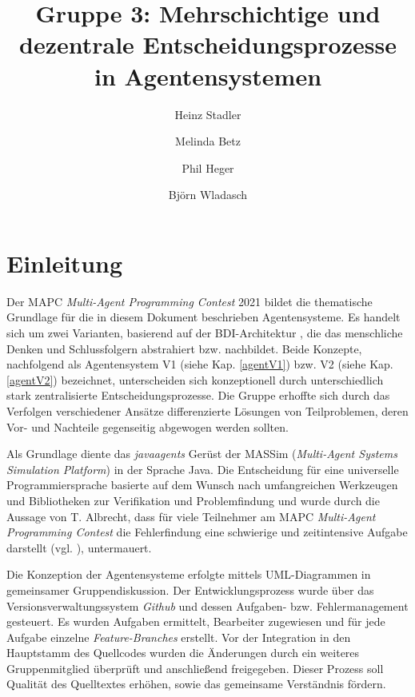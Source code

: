 \documentclass[runningheads]{llncs}
\begin{document}
	\title{Gruppe 3: Mehrschichtige und dezentrale Entscheidungsprozesse in Agentensystemen}
	\author{Heinz Stadler\and
		Melinda Betz\and
		Phil Heger\and
		Björn Wladasch}
	\maketitle              %
	\section{Einleitung}
	Der MAPC \textit{Multi-Agent Programming Contest} 2021 \cite{MAPC2021} bildet die thematische Grundlage für die in diesem Dokument beschrieben Agentensysteme. Es handelt sich um zwei Varianten, basierend auf der BDI-Architektur \cite{Bratman1987}, die das menschliche Denken und Schlussfolgern abstrahiert bzw. nachbildet. Beide Konzepte, nachfolgend als Agentensystem V1 (siehe Kap. \ref{agentV1}) bzw. V2 (siehe Kap. \ref{agentV2}) bezeichnet, unterscheiden sich konzeptionell durch unterschiedlich stark zentralisierte Entscheidungsprozesse.
	Die Gruppe erhoffte sich durch das Verfolgen verschiedener Ansätze differenzierte Lösungen von Teilproblemen, deren Vor- und Nachteile gegenseitig abgewogen werden sollten.
	
	
	Als Grundlage diente das \textit{javaagents} Gerüst der MASSim (\textit{Multi-Agent Systems Simulation Platform}) \cite{EISMASSim} in der Sprache Java. Die Entscheidung für eine universelle Programmiersprache basierte auf dem Wunsch nach umfangreichen Werkzeugen und Bibliotheken zur Verifikation und Problemfindung und wurde durch die Aussage von T. Albrecht, dass für viele Teilnehmer am MAPC \textit{Multi-Agent Programming Contest} die Fehlerfindung eine schwierige und zeitintensive Aufgabe darstellt (vgl. \cite[S. 17]{Ahlbrecht2021}), untermauert.
	
	Die Konzeption der Agentensysteme erfolgte mittels UML-Diagrammen in gemeinsamer Gruppendiskussion.
	Der Entwicklungsprozess wurde über das Versionsverwaltungssystem \textit{Github} und dessen Aufgaben- bzw. Fehlermanagement gesteuert. Es wurden Aufgaben ermittelt, Bearbeiter zugewiesen und für jede Aufgabe einzelne \textit{Feature-Branches} erstellt. Vor der Integration in den Hauptstamm des Quellcodes wurden die Änderungen durch ein weiteres Gruppenmitglied überprüft und anschließend freigegeben. Dieser Prozess soll Qualität des Quelltextes erhöhen, sowie das gemeinsame Verständnis fördern.
	
\end{document}
